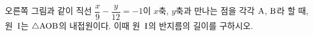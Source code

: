 \noindent\begin{minipage}[t]{0.58\linewidth}\vspace{0pt}\raggedright 오른쪽 그림과 같이 직선 $\dfrac{x}{9}-\dfrac{y}{12}=-1$이 $x$축, $y$축과 만나는 점을 각각 $\mathrm{A}$, $\mathrm{B}$라 할 때, 원~$\mathrm{I}$는 $\triangle\mathrm{AOB}$의 내접원이다. 이때 원~$\mathrm{I}$의 반지름의 길이를 구하시오. \end{minipage}\hfill\begin{minipage}[t]{0.4\linewidth}\vspace{0pt}\centering \resizebox{\ifdim\width>\linewidth\linewidth\else\width\fi}{!}{}\end{minipage}\par
